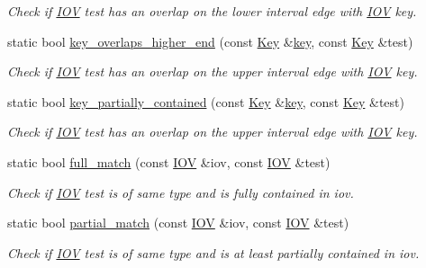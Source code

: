 \begin{DoxyCompactItemize}
\begin{DoxyCompactList}\small\item\em Check if \hyperlink{class_d_d4hep_1_1_i_o_v}{I\+OV} \textquotesingle{}test\textquotesingle{} has an overlap on the lower interval edge with \hyperlink{class_d_d4hep_1_1_i_o_v}{I\+OV} \textquotesingle{}key\textquotesingle{}. \end{DoxyCompactList}\item 
static bool \hyperlink{class_d_d4hep_1_1_i_o_v_a2bbff41fece1d4692a155f997fb7aebf}{key\+\_\+overlaps\+\_\+higher\+\_\+end} (const \hyperlink{class_d_d4hep_1_1_i_o_v_a07cb46dc875296dc9cccf4ff370104ae}{Key} \&\hyperlink{class_d_d4hep_1_1_i_o_v_a314b969532607ee37e1f3ac27e4e6f58}{key}, const \hyperlink{class_d_d4hep_1_1_i_o_v_a07cb46dc875296dc9cccf4ff370104ae}{Key} \&test)
\begin{DoxyCompactList}\small\item\em Check if \hyperlink{class_d_d4hep_1_1_i_o_v}{I\+OV} \textquotesingle{}test\textquotesingle{} has an overlap on the upper interval edge with \hyperlink{class_d_d4hep_1_1_i_o_v}{I\+OV} \textquotesingle{}key\textquotesingle{}. \end{DoxyCompactList}\item 
static bool \hyperlink{class_d_d4hep_1_1_i_o_v_ae2d6950a52f1d51409a19b76385252df}{key\+\_\+partially\+\_\+contained} (const \hyperlink{class_d_d4hep_1_1_i_o_v_a07cb46dc875296dc9cccf4ff370104ae}{Key} \&\hyperlink{class_d_d4hep_1_1_i_o_v_a314b969532607ee37e1f3ac27e4e6f58}{key}, const \hyperlink{class_d_d4hep_1_1_i_o_v_a07cb46dc875296dc9cccf4ff370104ae}{Key} \&test)
\begin{DoxyCompactList}\small\item\em Check if \hyperlink{class_d_d4hep_1_1_i_o_v}{I\+OV} \textquotesingle{}test\textquotesingle{} has an overlap on the upper interval edge with \hyperlink{class_d_d4hep_1_1_i_o_v}{I\+OV} \textquotesingle{}key\textquotesingle{}. \end{DoxyCompactList}\item 
static bool \hyperlink{class_d_d4hep_1_1_i_o_v_aa1b5388443f86ca31d23c99a34f444c5}{full\+\_\+match} (const \hyperlink{class_d_d4hep_1_1_i_o_v}{I\+OV} \&iov, const \hyperlink{class_d_d4hep_1_1_i_o_v}{I\+OV} \&test)
\begin{DoxyCompactList}\small\item\em Check if \hyperlink{class_d_d4hep_1_1_i_o_v}{I\+OV} \textquotesingle{}test\textquotesingle{} is of same type and is fully contained in iov. \end{DoxyCompactList}\item 
static bool \hyperlink{class_d_d4hep_1_1_i_o_v_ab55de0c04c0d06c457e248b4db839b08}{partial\+\_\+match} (const \hyperlink{class_d_d4hep_1_1_i_o_v}{I\+OV} \&iov, const \hyperlink{class_d_d4hep_1_1_i_o_v}{I\+OV} \&test)
\begin{DoxyCompactList}\small\item\em Check if \hyperlink{class_d_d4hep_1_1_i_o_v}{I\+OV} \textquotesingle{}test\textquotesingle{} is of same type and is at least partially contained in iov. \end{DoxyCompactList}\end{DoxyCompactItemize}
